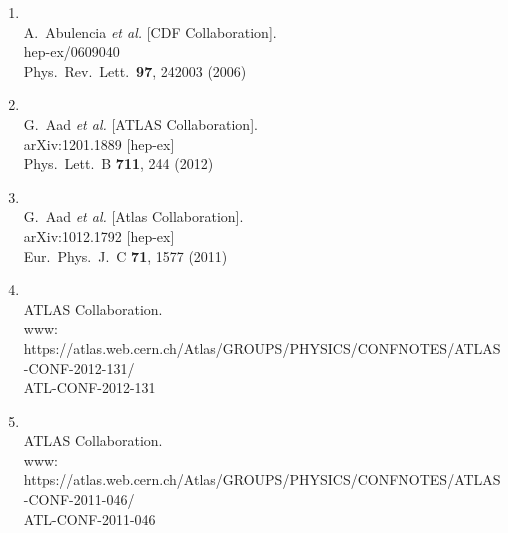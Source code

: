 \documentclass{article}
\begin{document}
\begin{enumerate}

\item%
{\bf {}}
  \\{}A.~Abulencia {\it et al.}  [CDF Collaboration].
  \\{}hep-ex/0609040
\\{}Phys.\ Rev.\ Lett.\  {\bf 97}, 242003 (2006) %

\item%
{\bf \color{red}{``Measurement of the top quark pair production cross-section with ATLAS in the single lepton channel''}}
  \\{}G.~Aad {\it et al.}  [ATLAS Collaboration].
  \\{}arXiv:1201.1889 [hep-ex]
\\{}Phys.\ Lett.\ B {\bf 711}, 244 (2012) %

\item%
{\bf {}}
  \\{}G.~Aad {\it et al.}  [Atlas Collaboration].
  \\{}arXiv:1012.1792 [hep-ex]
\\{}Eur.\ Phys.\ J.\ C {\bf 71}, 1577 (2011) %

\item%
{\bf {}}
  \\{}ATLAS Collaboration.
  \\{}www: https://atlas.web.cern.ch/Atlas/GROUPS/PHYSICS/CONFNOTES/ATLAS-CONF-2012-131/
  \\{}ATL-CONF-2012-131

\item%
  {\bf \color{red}{``Muon Momentum Resolution in First Pass Reconstruction of pp Collision Data Recorded by ATLAS in 2010``}}
  \\{}ATLAS Collaboration.
  \\{}www: https://atlas.web.cern.ch/Atlas/GROUPS/PHYSICS/CONFNOTES/ATLAS-CONF-2011-046/
  \\{}ATL-CONF-2011-046


\end{enumerate}
\end{document}
